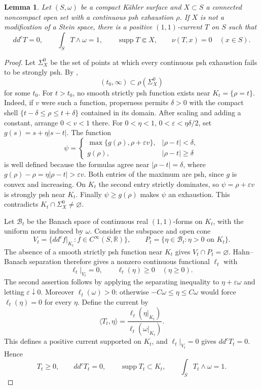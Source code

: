 \documentclass[11pt]{amsart}
\newtheorem{lemma}[theorem]{Lemma}
\theoremstyle{definition}
\theoremstyle{remark}
\numberwithin{equation}{section}
\newcommand{\R}{\mathbb R}
\newcommand{\ddc}{dd^c}
\newcommand{\supp}{\operatorname{supp}}
\begin{document}
\begin{lemma}\label{lem:level-averaging}
Let $(S,\omega)$ be a compact K\"ahler surface and $X\subset S$
a connected noncompact open set with a continuous psh exhaustion
$\rho$. If $X$ is not a modification of a Stein space, there is
a positive $(1,1)$-current $T$ on $S$ such that
\begin{equation}\label{eq:averaged-current-properties}
 \ddc T=0,\qquad \int_S T\wedge\omega=1,\qquad
 \supp T\Subset X,\qquad \nu(T,x)=0\quad(x\in S).
\end{equation}
\end{lemma}
\begin{proof}
Let $\Sigma_X^0$ be the set of points at which every continuous
psh exhaustion fails to be strongly psh. By
\cite[Lemma~2.1]{MongodiSlodkowski2020},
\begin{equation}\label{eq:kernel-halfline}
 (t_0,\infty)\subset\rho(\Sigma_X^0)
\end{equation}
for some $t_0$. For $t>t_0$, no smooth strictly psh function exists
near $K_t=\{\rho=t\}$. Indeed, if $v$ were such a function,
properness permits $\delta>0$ with the compact shell
$\{t-\delta\le\rho\le t+\delta\}$ contained in its domain.
After scaling and adding a constant, arrange $0<v<1$ there. For
$0<\eta<1$, $0<\varepsilon<\eta\delta/2$, set
$g(s)=s+\eta|s-t|$. The function
\[
 \psi=
 \begin{cases}
 \max\{g(\rho),\rho+\varepsilon v\},& |\rho-t|<\delta,\\
 g(\rho),& |\rho-t|\ge\delta
 \end{cases}
\]
is well defined because the formulas agree near $|\rho-t|=\delta$,
where $g(\rho)-\rho=\eta|\rho-t|>\varepsilon v$. Both entries of the
maximum are psh, since $g$ is convex and increasing.
On $K_t$ the second entry strictly dominates, so
$\psi=\rho+\varepsilon v$ is strongly psh near $K_t$.
Finally $\psi\ge g(\rho)$ makes $\psi$ an exhaustion. This
contradicts $K_t\cap\Sigma_X^0\ne\varnothing$.

Let $\mathcal B_t$ be the Banach space of continuous real
$(1,1)$-forms on $K_t$, with the uniform norm induced by $\omega$.
Consider the subspace and open cone
\[
 V_t=\{\ddc f|_{K_t}:f\in C^\infty(S,\R)\},\qquad
 P_t=\{\eta\in\mathcal B_t:\eta>0\text{ on }K_t\}.
\]
The absence of a smooth strictly psh function near $K_t$ gives
$V_t\cap P_t=\varnothing$. Hahn--Banach separation therefore
gives a nonzero continuous functional $\ell_t$ with
\[
 \ell_t|_{V_t}=0,\qquad \ell_t(\eta)\ge0\quad(\eta\ge0).
\]
The second assertion follows by applying the separating inequality
to $\eta+\varepsilon\omega$ and letting $\varepsilon\downarrow0$.
Moreover $\ell_t(\omega)>0$: otherwise
$-C\omega\le\eta\le C\omega$ would force $\ell_t(\eta)=0$ for
every $\eta$. Define the current by
\[
 \langle T_t,\eta\rangle
   =\frac{\ell_t(\eta|_{K_t})}{\ell_t(\omega|_{K_t})}.
\]
This defines a positive current supported on $K_t$, and
$\ell_t|_{V_t}=0$ gives $\ddc T_t=0$. Hence
\begin{equation}\label{eq:level-current}
 T_t\ge0,\qquad \ddc T_t=0,\qquad
 \supp T_t\subset K_t,\qquad \int_S T_t\wedge\omega=1.
\end{equation}


\end{proof}
\end{document}
